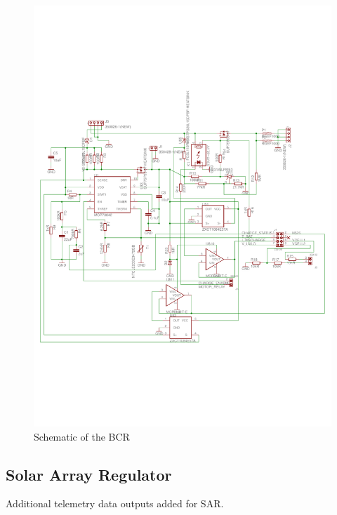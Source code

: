 \begin{figure}[H]
\centering
\includegraphics[width=\textwidth]{figures/fig_Schematic_BCR}
\caption{Schematic of the \acl{BCR}}
\label{fig:BCR_Schematic}
\end{figure}

\subsection{Solar Array Regulator}

Additional telemetry data outputs added for SAR.

